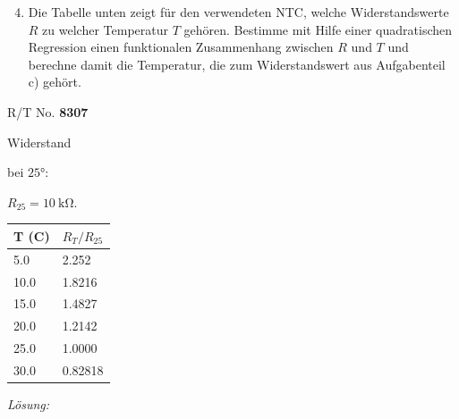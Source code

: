 \documentclass[ngerman, 11pt]{scrreprt}
\begin{document}
\begin{aufgabe}
		\begin{minipage}{0.48\textwidth}
			\begin{enumerate}[label=\alph*), itemsep=0mm, parsep=0mm]
				\setcounter{enumi}{3}
				\item Die Tabelle unten zeigt für den verwendeten NTC, welche Widerstandswerte $R$ zu welcher Temperatur $T$ gehören. Bestimme mit Hilfe einer quadratischen Regression einen funktionalen Zusammenhang zwischen $R$ und $T$ und berechne damit die Temperatur, die zum Widerstandswert aus Aufgabenteil c) gehört.
			\end{enumerate}
		\end{minipage}
		\hfill
		\begin{minipage}{0.48\textwidth}
			\begin{tcolorbox}
				\begin{minipage}{0.48\textwidth}
					R/T No. \textbf{8307}
					
					\bigskip
					Widerstand
					
					bei $\ang{25}$: 
					
					$R_{25}=\SI{10}{\kilo\ohm}$.
					
					\vspace{2\baselineskip}
				\end{minipage}
				\hfill
				\begin{minipage}{0.48\textwidth}
					\begin{tabular}{l | l }
						T (C) & $R_T/R_{25}$ \\ \hline
						5.0 & 2.252 \\ \hline
						10.0 & 1.8216 \\ \hline
						15.0 & 1.4827 \\ \hline
						20.0 & 1.2142 \\ \hline
						25.0 & 1.0000 \\ \hline
						30.0 & 0.82818 \\ \hline
					\end{tabular}
				\end{minipage}
			\end{tcolorbox}
		\end{minipage}
	\end{aufgabe}
	
	\bigskip
	\emph{Lösung:}
	
\end{document}
